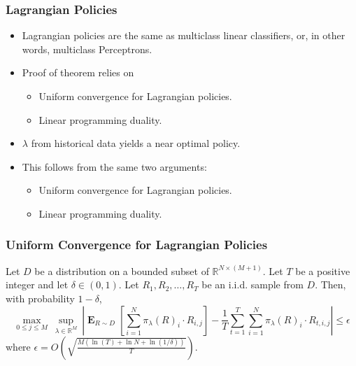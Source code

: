 \documentclass[usenames,dvipsnames]{beamer}
\DeclareMathOperator*{\Exp}{\mathbf{E}}
\newcommand{\R}{\mathbb{R}}
\begin{document}
\begin{frame}
\frametitle{Lagrangian Policies}

\begin{itemize}
\item Lagrangian policies are the same as multiclass linear classifiers, or, in other words, multiclass Perceptrons.

\item Proof of theorem relies on
\begin{itemize}
\item Uniform convergence for Lagrangian policies.
\item Linear programming duality.
\end{itemize}

\item $\lambda$ from historical data yields a near optimal policy.
\item This follows from the same two arguments:
\begin{itemize}
\item Uniform convergence for Lagrangian policies.
\item Linear programming duality.
\end{itemize}

\end{itemize}

\end{frame}

\begin{frame}
\frametitle{Uniform Convergence for Lagrangian Policies}

\begin{theorem}
Let $D$ be a distribution on a bounded subset of $\R^{N \times (M+1)}$. Let $T$
be a positive integer and let $\delta \in (0,1)$. Let $R_1, R_2, \dots, R_T$ be
an i.i.d. sample from $D$. Then, with probability $1-\delta$,
$$
\max_{0 \le j \le M} \ \sup_{\lambda \in \R^M} \ \left| \Exp_{R \sim D} \left[ \sum_{i=1}^N \pi_\lambda(R)_i \cdot R_{i,j} \right] -  \frac{1}{T} \sum_{t=1}^T \sum_{i=1}^N \pi_\lambda(R)_i \cdot R_{t,i,j} \right| \le \epsilon
$$
where $\epsilon = O\left( \sqrt{\frac{M (\ln(T) + \ln N + \ln(1/\delta))}{T}} \right)$.
\end{theorem}

\end{frame}
\end{document}
